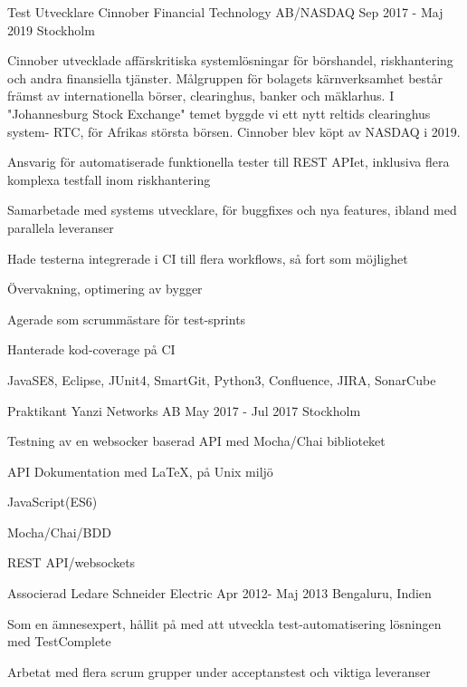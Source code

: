 \documentclass[12pt, a4paper]{awesome-cv}
\begin{document}
\begin{cventries}
    \cventry
      {Test Utvecklare}
      {Cinnober Financial Technology AB/NASDAQ}
      {Sep 2017 - Maj 2019}
      {Stockholm}
      {
        \justify
        Cinnober utvecklade affärskritiska systemlösningar för börshandel, riskhantering och andra
        finansiella tjänster. Målgruppen för bolagets kärnverksamhet består främst av internationella börser,
        clearinghus, banker och mäklarhus. I "Johannesburg Stock Exchange" temet
        byggde vi ett nytt reltids clearinghus system- RTC, för Afrikas största börsen. Cinnober blev köpt av NASDAQ i 2019.
        \hfill \break
        \hfill \break
        \begin{cvitems}
          \item Ansvarig för automatiserade funktionella tester till REST APIet, inklusiva flera komplexa testfall inom riskhantering
          \item Samarbetade med systems utvecklare, för buggfixes och nya features, ibland med parallela leveranser
          \item Hade testerna integrerade i CI till flera workflows, så fort som möjlighet
          \item Övervakning, optimering av bygger
          \item Agerade som scrummästare för test-sprints
          \item Hanterade kod-coverage på CI
          \item JavaSE8, Eclipse, JUnit4, SmartGit, Python3, Confluence, JIRA, SonarCube
        \end{cvitems}
      }

    \cventry
      {Praktikant}
      {Yanzi Networks AB}
      {May 2017 - Jul 2017}
      {Stockholm}
      {
        \begin{cvitems}
          \item Testning av en websocker baserad API med Mocha/Chai biblioteket
          \item API Dokumentation med LaTeX, på Unix miljö
          \item JavaScript(ES6)
          \item Mocha/Chai/BDD
          \item REST API/websockets
          \end{cvitems}
      }


    \cventry
      {Associerad Ledare}
      {Schneider Electric}
      {Apr 2012- Maj 2013}
      {Bengaluru, Indien}
      {
        \begin{cvitems}
          \item Som en ämnesexpert, hållit på med att utveckla test-automatisering lösningen med TestComplete
          \item Arbetat med flera scrum grupper under acceptanstest och viktiga leveranser
          \end{cvitems}
      }


\end{cventries}
\end{document}

